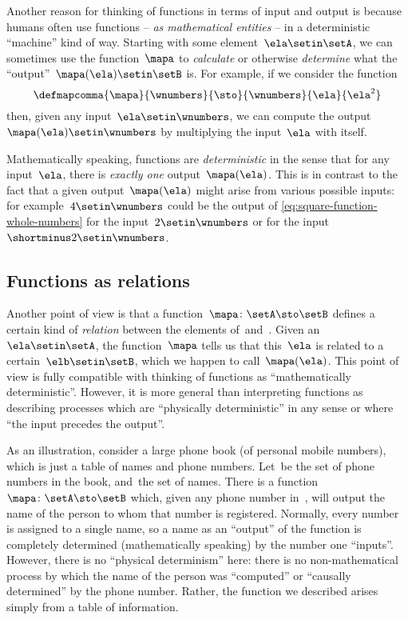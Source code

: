 Another reason for thinking of functions in terms of input and output is because humans often use functions -- \emph{as mathematical entities} -- in a deterministic ``machine'' kind of way.
Starting with some element~$\ela \setin\setA$, we can sometimes use the function~$\mapa$ to \emph{calculate} or otherwise \emph{determine} what the ``output''~$\mapa(\ela) \setin\setB$ is.
For example, if we consider the function
%
\begin{equation}
    \label{eq:square-function-whole-numbers}
    \defmapcomma{
        \mapa
    }{
        \wnumbers
    }{
        \sto
    }{
        \wnumbers
    }{
        \ela
    }{
        \ela^2
    }
\end{equation}
%
then, given any input~$\ela \setin\wnumbers$, we can compute the output~$\mapa(\ela) \setin\wnumbers$ by multiplying the input~$\ela$ with itself.

Mathematically speaking, functions are \emph{deterministic} in the sense that for any input~$\ela$, there is \emph{exactly one} output~$\mapa(\ela)$.
This is in contrast to the fact that a given output~$\mapa(\ela)$ might arise from various possible inputs: for example~$4 \setin\wnumbers$ could be the output of \cref{eq:square-function-whole-numbers} for the input~$2 \setin\wnumbers$ or for the input~$\shortminus 2 \setin\wnumbers$.

\subsection{Functions as relations}

Another point of view is that a function~$\mapa\colon \setA \sto \setB$ defines a certain kind of \emph{relation} between the elements of~\setA and~\setB.
Given an~$\ela \setin\setA$, the function~$\mapa$ tells us that this~$\ela$ is related to a certain~$\elb \setin \setB$, which we happen to call~$\mapa(\ela)$.
This point of view is fully compatible with thinking of functions as ``mathematically deterministic''.
However, it is more general than interpreting functions as describing processes which are ``physically deterministic'' in any sense or where ``the input precedes the output''.

As an illustration, consider a large phone book (of personal mobile numbers), which is just a table of names and phone numbers.
Let~\setA be the set of phone numbers in the book, and~\setB the set of names.
There is a function~$\mapa\colon \setA \sto \setB$ which, given any phone number in~\setA, will output the name of the person to whom that number is registered.
Normally, every number is assigned to a single name, so a name as an ``output'' of the function is completely determined (mathematically speaking) by the number one ``inputs''.
However, there is no ``physical determinism'' here: there is no non-mathematical process by which the name of the person was ``computed'' or ``causally determined'' by the phone number.
Rather, the function we described arises simply from a table of information.

